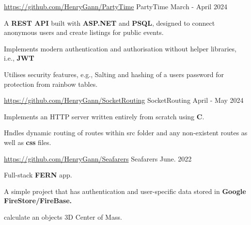 
\begin{cventries}
  \cventry
    {\href{https://github.com/HenryGann/PartyTime}{\faLink \space https://github.com/HenryGann/PartyTime}}
    {PartyTime}
    {}
    {March - April 2024} %
    {
      \begin{cvitems}
        \item {A \textbf{REST API} built with \textbf{ASP.NET} and \textbf{PSQL}, designed to connect anonymous users and create listings for public events.}
        \item {Implements modern authentication and authorisation without helper libraries, i.e., \textbf{JWT}}
        \item {Utilises security features, e.g., Salting and hashing of a users password for protection from rainbow tables.}
      \end{cvitems}
    }

  \cventry
    {\href{https://github.com/HenryGann/SocketRouting}{\faLink \space https://github.com/HenryGann/SocketRouting}} %
    {SocketRouting} %
    {} %
    {April - May 2024} %
    {
      \begin{cvitems} %
        \item {Implements an HTTP server written entirely from scratch using \textbf{C}. }
        \item {Hndles dynamic routing of routes within src folder and any non-existent routes as well as \textbf{css} files. }
      \end{cvitems}
    }

  \cventry
  {\href{https://github.com/HenryGann/Seafarers}{\faLink \space https://github.com/HenryGann/Seafarers}} %
  {Seafarers} %
  {} %
  {June. 2022} %
  {
    \begin{cvitems} %
      \item {Full-stack \textbf{FERN} app.}
      \item {A simple project that has authentication and user-specific data stored in \textbf{Google FireStore/FireBase.}}
      \item {calculate an objects 3D Center of Mass.}
    \end{cvitems}
  }

\end{cventries}
